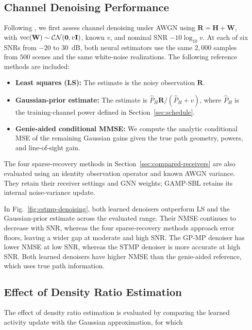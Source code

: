 \subsection{Channel Denoising Performance}
\label{sec:denoising-performance}
Following \cite[Sec.~VI-B]{cai2026}, we first assess channel denoising
under AWGN using $\mathbf R=\mathbf H+\mathbf W$, with
$\operatorname{vec}(\mathbf W)\sim\mathcal{CN}(\mathbf0,v\mathbf{I})$, known $v$, and nominal SNR
$-10\log_{10}v$. At each of six SNRs from $-20$ to $30$~dB, both
neural estimators use the same $2{,}000$ samples from $500$ scenes and
the same white-noise realizations. The following reference methods are included:
\begin{itemize}[leftmargin=*,topsep=2pt,itemsep=2pt,parsep=0pt]
\item \textbf{Least squares (LS):} The estimate is the noisy observation
$\mathbf R$.
\item \textbf{Gaussian-prior estimate:} The estimate is
$\widehat P_H\mathbf R/(\widehat P_H+v)$, where $\widehat P_H$ is the
training-channel power defined in Section~\ref{sec:schedule}.
\item \textbf{Genie-aided conditional MMSE:} We compute the analytic
conditional MSE of the remaining Gaussian gains given the true path
geometry, powers, and line-of-sight gain.
\end{itemize}
The four sparse-recovery methods in Section~\ref{sec:compared-receivers}
are also evaluated using an identity observation operator and known AWGN
variance. They retain their receiver settings and GNN weights;
GAMP-SBL retains its internal noise-variance update.

In Fig.~\ref{fig:cstmp-denoising}, both learned denoisers outperform LS
and the Gaussian-prior estimate across the evaluated range.
Their NMSE continues to decrease with SNR, whereas the four sparse-recovery
methods approach error floors, leaving a wider gap at moderate and high SNR.
The GP-MP denoiser has lower NMSE at low SNR,
whereas the STMP denoiser is more accurate at high SNR.
Both learned denoisers have higher NMSE than the genie-aided reference,
which uses true path information.

\subsection{Effect of Density Ratio Estimation}
\label{sec:activity-evidence}
The effect of density ratio estimation is evaluated by comparing the
learned activity update with the Gaussian approximation, for which

